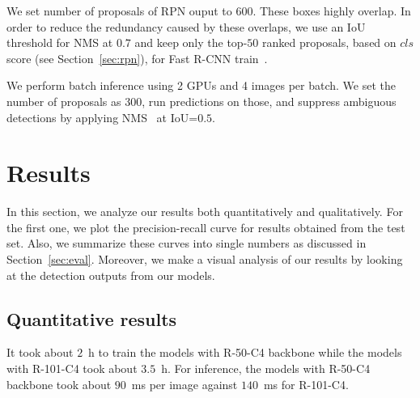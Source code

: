 We set number of proposals of RPN ouput to $600$.
These boxes highly overlap.
In order to reduce the redundancy caused by these overlaps,
we use an IoU threshold for NMS at $0.7$ and keep only the top-$50$ ranked proposals, based on $cls$ score (see Section~\ref{sec:rpn}), for Fast R-CNN train~\cite{Ren2017fasterpami}.

We perform batch inference using 2 GPUs and 4 images per batch.
We set the number of proposals as 300, run predictions on those, and suppress ambiguous detections by applying NMS~\cite{Girshick2015DPM} at IoU=$0.5$.

\section{Results}
%
In this section, we analyze our results both quantitatively and qualitatively.
For the first one, we plot the precision-recall curve for results obtained from the test set.
Also, we summarize these curves into single numbers as discussed in Section~\ref{sec:eval}.
Moreover, we make a visual analysis of our results by looking at the detection outputs from our models.


\subsection{Quantitative results}
%
It took about $2$~h to train the models with R-50-C4 backbone while the models with R-101-C4 took about $3.5$~h.
For inference, the models with R-50-C4 backbone took about $90$~ms per image against $140$~ms for R-101-C4.
%

